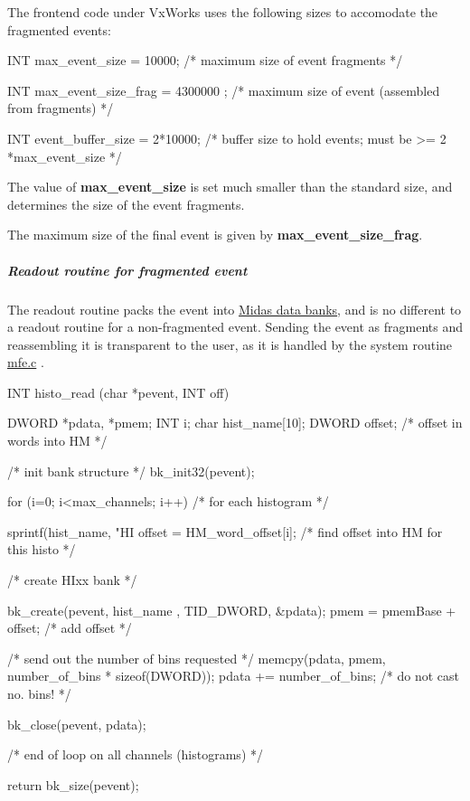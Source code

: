 The frontend code under VxWorks uses the following sizes to accomodate the fragmented events: 
\begin{DoxyCode}
    INT max_event_size = 10000; /* maximum size of event fragments */

    INT max_event_size_frag = 4300000  ; /* maximum size of event (assembled from
       fragments) */

    INT event_buffer_size = 2*10000; /* buffer size to hold events; must be  >= 2
      *max_event_size  */
\end{DoxyCode}



\begin{DoxyItemize}
\item The value of {\bfseries max\_\-event\_\-size} is set much smaller than the standard size, and determines the size of the event fragments.
\item The maximum size of the final event is given by {\bfseries max\_\-event\_\-size\_\-frag}.
\end{DoxyItemize}\hypertarget{FE_eq_event_routines_FE_frag_readout_code}{}\subparagraph{Readout routine for fragmented event}\label{FE_eq_event_routines_FE_frag_readout_code}
The readout routine packs the event into \hyperlink{FE_bank_construction}{Midas data banks}, and is no different to a readout routine for a non-\/fragmented event. Sending the event as fragments and reassembling it is transparent to the user, as it is handled by the system routine \hyperlink{mfe_8c}{mfe.c} .


\begin{DoxyCode}
INT histo_read (char *pevent, INT off)
{
  DWORD *pdata, *pmem;
  INT i;
  char hist_name[10];
  DWORD offset; /* offset in words into HM */

  /* init bank structure */
  bk_init32(pevent);

  for (i=0; i<max_channels; i++)   /* for each histogram */

  {
    sprintf(hist_name, "HI%
    offset = HM_word_offset[i]; /* find offset into HM for this histo */

    /* create HIxx bank */

      bk_create(pevent, hist_name , TID_DWORD, &pdata);
      pmem = pmemBase + offset; /* add offset */



      /* send out the number of bins requested */
      memcpy(pdata, pmem, number_of_bins * sizeof(DWORD));
      pdata +=  number_of_bins; /* do not cast no. bins! */
     
      bk_close(pevent, pdata);
    
  } /* end of loop on all channels (histograms) */

  return bk_size(pevent);
}
\end{DoxyCode}


